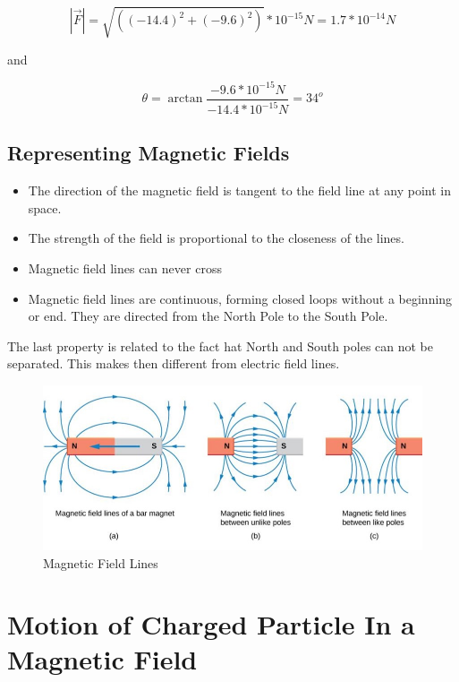 \documentclass[14pt]{memoir}
\begin{document}
\begin{equation}
|\vec{F}| = \sqrt{ ((-14.4)^2 + (-9.6)^2)} * 10^{-15} N = 1.7 * 10^{-14} N
\end{equation}

and 

\begin{equation}
\theta = \arctan{\frac{-9.6 * 10^{-15}N}{-14.4 * 10^{-15}N}} = 34^{o}
\end{equation}


\subsection{Representing Magnetic Fields}

\begin{itemize}
\item The direction of the magnetic field is tangent to the field line at any point in space. 
\item The strength of the field is proportional to the closeness of the lines. 
\item Magnetic field lines can never cross
\item Magnetic field lines are continuous, forming closed loops without a beginning or end. They are directed from the North Pole to the South Pole. 
\end{itemize}

The last property is related to the fact hat North and South poles can not be separated. This makes then different from electric field lines. 

\begin{figure}[H]
\begin{center}
\includegraphics[scale=0.60]{fig/fig_11_06.jpg}
\caption{Magnetic Field Lines}
\label{fig:11_06}
\end{center}
\end{figure}

\section{Motion of Charged Particle In a Magnetic Field}
\end{document}

